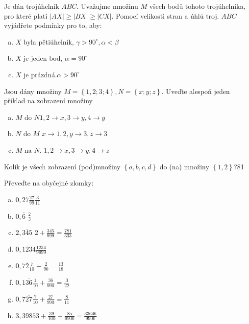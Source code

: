 \begin{example}[SÚM 173/37*]
  Je dán trojúhelník $ABC$. Uvažujme množinu $M$ všech bodů tohoto trojúhelníka, pro které platí $|AX| \geq |BX| \geq |CX|.$ Pomocí velikosti stran a úhlů troj. $ABC$ vyjádřete podmínky pro to, aby:
  \begin{enumerate}[a.]
    \item $X$ byla pětiúhelník, \hfill $\gamma > 90^\circ, \alpha < \beta$
    \item $X$  je jeden bod, \hfill $\alpha = 90^\circ$
    \item $X$ je prázdná.\hfill $\alpha > 90^\circ$
  \end{enumerate}
\end{example}


\begin{example}[SÚM 174/42]
  Jsou dány množiny $M=\left\{1,2;3;4\right\},N=\left\{x;y;z\right\}.$ Uveďte alespoň jeden příklad na zobrazení množiny
  \begin{enumerate}[a.]
    \item $M$ do $N$\hfill $1,2\rightarrow x, 3\rightarrow y, 4 \rightarrow y$
    \item $N$ do $M$ \hfill $x\rightarrow 1,2, y\rightarrow 3, z\rightarrow 3$
    \item $M$ na $N.$ \hfill $1,2\rightarrow x, 3 \rightarrow y, 4 \rightarrow z$
  \end{enumerate}
\end{example}

\begin{example}[SÚM 174/46]
  Kolik je všech zobrazení (pod)množiny $\left\{a,b,c,d\right\}$ do (na) množiny $\left\{1,2\right\}$?\hfill \rm 81
\end{example}

\begin{example}[SÚM 106/20]
  Převeďte na obyčejné zlomky:
  \begin{enumerate}[a.]
    \item $0,\overline{27}$\hfill $\frac{27}{99}\frac{3}{11}$
    \item $0,\overline{6}$ \hfill $\frac{2}{3}$
    \item $2,\overline{345}$ \hfill $2+\frac{345}{999}=\frac{781}{333}$
    \item $0,\overline{1234}$\hfill $\frac{1234}{9999}$
    \item $0,7\overline{2}$\hfill $\frac{7}{10}+\frac{2}{90}=\frac{13}{18}$
    \item $0,1\overline{36}$\hfill $\frac{1}{10}+\frac{36}{990}=\frac{3}{22}$
    \item $0,7\overline{27}$\hfill $\frac{7}{10}+\frac{27}{990}=\frac{8}{11}$
    \item $3,39\overline{85}$\hfill $3+\frac{39}{100}+\frac{85}{9900}=\frac{33646}{9900}$
  \end{enumerate}
\end{example}

